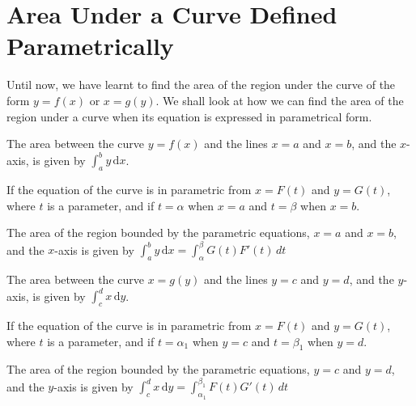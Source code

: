 \documentclass[11pt,a4paper]{book}
\begin{document}
\newpage{}

\section{Area Under a Curve Defined Parametrically}

Until now, we have learnt to find the area of the region under the
curve of the form $y=f(x)$ or $x=g(y)$. We shall look at how we
can find the area of the region under a curve when its equation is
expressed in parametrical form.

\begin{tcolorbox}[colback=blue!5, colframe=black, boxrule=.4pt, sharpish corners]
The area between the curve $y=f(x)$ and the lines $x=a$ and $x=b$, and the $x$-axis, is given by ${\displaystyle \int_{a}^{b}y\,\mathrm{d}x}$.

If the equation of the curve is in parametric from $x=F(t)$ and $y=G(t)$, where $t$ is a parameter, and if $t=\alpha$ when $x=a$ and $t=\beta$ when $x=b$.

The area of the region bounded by the parametric equations, $x=a$ and $x=b$, and the $x$-axis is given by ${\displaystyle \int_{a}^{b}y\,\mathrm{d}x=\int_{\alpha}^{\beta}G(t)F'(t)\,dt}$

The area between the curve $x=g(y)$ and the lines $y=c$ and $y=d$, and the $y$-axis, is given by ${\displaystyle \int_{c}^{d}x\,\mathrm{d}y}$.

If the equation of the curve is in parametric from $x=F(t)$ and $y=G(t)$, where $t$ is a parameter, and if $t=\alpha_{1}$ when $y=c$ and $t=\beta_{1}$ when $y=d$.

The area of the region bounded by the parametric equations, $y=c$ and $y=d$, and the $y$-axis is given by ${\displaystyle \int_{c}^{d}x\,\mathrm{d}y=\int_{\alpha_{1}}^{\beta_{1}}F(t)G'(t)\,dt}$%
\end{tcolorbox}
\end{document}
